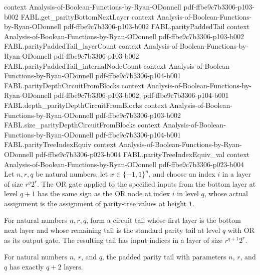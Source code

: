 \begin{theorem}
  {context}
  {Analysis-of-Boolean-Functions-by-Ryan-ODonnell}
  {pdf-ffbe9c7b3306-p103-b002}
\proofstep
  {FABL.get_parityBottomNextLayer}
  {context}
  {Analysis-of-Boolean-Functions-by-Ryan-ODonnell}
  {pdf-ffbe9c7b3306-p103-b002}
\proofstep
  {FABL.parityPaddedTail}
  {context}
  {Analysis-of-Boolean-Functions-by-Ryan-ODonnell}
  {pdf-ffbe9c7b3306-p103-b002}
\proofstep
  {FABL.parityPaddedTail_layerCount}
  {context}
  {Analysis-of-Boolean-Functions-by-Ryan-ODonnell}
  {pdf-ffbe9c7b3306-p103-b002}
\proofstep
  {FABL.parityPaddedTail_internalNodeCount}
  {context}
  {Analysis-of-Boolean-Functions-by-Ryan-ODonnell}
  {pdf-ffbe9c7b3306-p104-b001}
\proofstep
  {FABL.parityDepthCircuitFromBlocks}
  {context}
  {Analysis-of-Boolean-Functions-by-Ryan-ODonnell}
  {pdf-ffbe9c7b3306-p103-b002,
    pdf-ffbe9c7b3306-p104-b001}
\proofstep
  {FABL.depth_parityDepthCircuitFromBlocks}
  {context}
  {Analysis-of-Boolean-Functions-by-Ryan-ODonnell}
  {pdf-ffbe9c7b3306-p103-b002}
\proofstep
  {FABL.size_parityDepthCircuitFromBlocks}
  {context}
  {Analysis-of-Boolean-Functions-by-Ryan-ODonnell}
  {pdf-ffbe9c7b3306-p104-b001}
\proofstep
  {FABL.parityTreeIndexEquiv}
  {context}
  {Analysis-of-Boolean-Functions-by-Ryan-ODonnell}
  {pdf-ffbe9c7b3306-p023-b004}
\proofstep
  {FABL.parityTreeIndexEquiv_val}
  {context}
  {Analysis-of-Boolean-Functions-by-Ryan-ODonnell}
  {pdf-ffbe9c7b3306-p023-b004}
Let $n,r,q$ be natural numbers, let $x\in\{-1,1\}^n$, and choose an index $i$ in a layer
of size $r^q2^r$. The OR gate applied to the specified inputs from the bottom layer at
level $q+1$ has the same sign as the OR node at index $i$ in level $q$, whose actual
assignment is the assignment of parity-tree values at height $1$.
\end{theorem}

\begin{definition}
\label{FABL.parityPaddedTail}
\leanok
{}
For natural numbers $n,r,q$, form a circuit tail whose first layer is the bottom next
layer and whose remaining tail is the standard parity tail at level $q$ with OR as its
output gate. The resulting tail has input indices in a layer of size $r^{q+1}2^r$.
\end{definition}

\begin{theorem}
\label{FABL.parityPaddedTail_layerCount}
\leanok
{}
For natural numbers $n$, $r$, and $q$, the padded parity tail with parameters $n$, $r$,
and $q$ has exactly $q+2$ layers.
\end{theorem}

